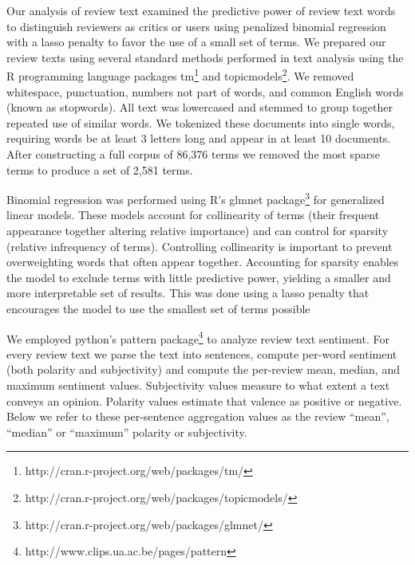 \documentclass[letterpaper]{article}
\begin{document}
Our analysis of review text examined the predictive power of review text words to distinguish reviewers as critics or users using penalized binomial regression with a lasso penalty to favor the use of a small set of terms. 
We prepared our review texts using several standard methods performed in text analysis using the R programming language packages tm\footnote{http://cran.r-project.org/web/packages/tm/} and topicmodels\footnote{http://cran.r-project.org/web/packages/topicmodels/}. We removed whitespace, punctuation, numbers not part of words, and common English words (known as stopwords). All text was lowercased and stemmed to group together repeated use of similar words. We tokenized these documents into single words, requiring words be at least 3 letters long and appear in at least 10 documents. After constructing a full corpus of 86,376 terms we removed the most sparse terms to produce a set of 2,581 terms.

Binomial regression was performed using R's glmnet package\footnote{http://cran.r-project.org/web/packages/glmnet/} for generalized linear models. These models account for collinearity of terms (their frequent appearance together altering relative importance) and can control for sparsity (relative infrequency of terms). Controlling collinearity is important to prevent overweighting words that often appear together. Accounting for sparsity enables the model to exclude terms with little predictive power, yielding a smaller and more interpretable set of results. This was done using a lasso penalty that encourages the model to use the smallest set of terms possible

We employed python's pattern package\footnote{http://www.clips.ua.ac.be/pages/pattern} to analyze review text sentiment. For every review text we parse the text into sentences, compute per-word sentiment (both polarity and subjectivity) and compute the per-review mean, median, and maximum sentiment values. Subjectivity values measure to what extent a text conveys an opinion. Polarity values estimate that valence as positive or negative. Below we refer to these per-sentence aggregation values as the review ``mean'', ``median'' or ``maximum'' polarity or subjectivity.

\end{document}
